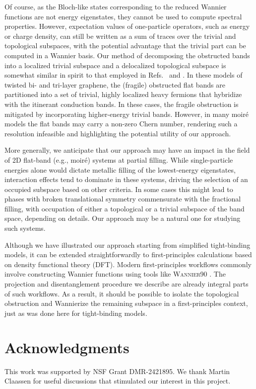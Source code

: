 \documentclass[galley,aps,pra,10pt,amsmath,amssymb,
    superscriptaddress,nofootinbib,longbibliography]{revtex4-2}
\newcounter{comm}
\begin{document}
Of course, as the Bloch-like states corresponding to the reduced Wannier functions are not energy eigenstates, they cannot be used to compute spectral properties. However, expectation values of one-particle operators, such as energy or charge density, can still be written as a sum of traces over the trivial and topological subspaces, with the potential advantage that the trivial part can be computed in a Wannier basis. Our method of decomposing the obstructed bands into a localized trivial subspace and a delocalized topological subspace is somewhat similar in spirit to that employed in Refs.~\cite{song2022} and \cite{yu2023}. In these models of twisted bi- and tri-layer graphene, the (fragile) obstructed flat bands are partitioned into a set of trivial, highly localized heavy fermions that hybridize with the itinerant conduction bands. In these cases, the fragile obstruction is mitigated by incorporating higher-energy trivial bands. However, in many moiré models the flat bands may carry a non-zero Chern number, rendering such a resolution infeasible and highlighting the potential utility of our approach.

More generally, we anticipate that our approach may have an impact in the field of 2D flat-band (e.g., moir\'e) systems at partial filling.  While single-particle energies alone would dictate metallic filling of the lowest-energy eigenstates, interaction effects tend to dominate in these systems, driving the selection of an occupied subspace based on other criteria. In some cases this might lead to phases with broken translational symmetry commensurate with the fractional filling, with occupation of either a topological or a trivial subspace of the band space, depending on details. Our approach may be a natural one for studying such systems.

Although we have illustrated our approach starting from simplified tight-binding models, it can be extended straightforwardly to first-principles calculations based on density functional theory (DFT). Modern first-principles workflows commonly involve constructing Wannier functions using tools like \textsc{Wannier90} \cite{MOSTOFI20142309, Marrazzo2023TheWS}. The projection and disentanglement procedure we describe are already integral parts of such workflows. As a result, it should be possible to isolate the topological obstruction and Wannierize the remaining subspace in a first-principles context, just as was done here for tight-binding models. 


 \section*{Acknowledgments}

This work was supported by NSF Grant DMR-2421895. We thank Martin Claassen for useful discussions that stimulated our interest in this project.

\newpage

\end{document}
